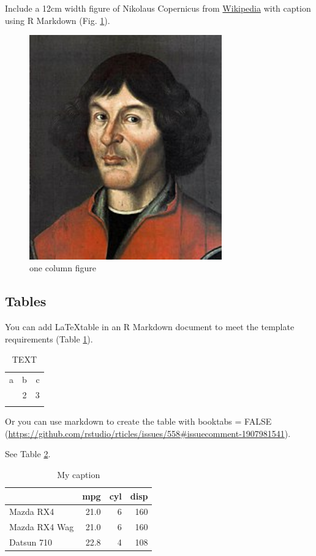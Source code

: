 \documentclass[soil, manuscript]{copernicus}
\begin{document}
Include a 12cm width figure of Nikolaus Copernicus from \href{https://en.wikipedia.org/wiki/File:Nikolaus_Kopernikus.jpg}{Wikipedia} with caption using R Markdown (Fig. \ref{fig:portrait}).

\begin{figure}
\includegraphics[width=8.3cm]{Nikolaus_Kopernikus} \caption{one column figure}\label{fig:portrait}
\end{figure}

\subsection{Tables}

You can add \LaTeX table in an R Markdown document to meet the template requirements (Table \ref{tab:latextable}).

\begin{table}[t]
\caption{TEXT}
\begin{tabular}{l c r}
\tophline

a & b & c \\
\middlehline
1 & 2 & 3 \\

\bottomhline
\end{tabular}
\label{tab:latextable}
\end{table}

Or you can use markdown to create the table with booktabs = FALSE (\url{https://github.com/rstudio/rticles/issues/558\#issuecomment-1907981541}).

See Table \ref{tab:test}.

\begin{table}

\caption{\label{tab:test}My caption}
\centering
\begin{tabular}[t]{l|r|r|r}
\hline
  & mpg & cyl & disp\\
\hline
Mazda RX4 & 21.0 & 6 & 160\\
\hline
Mazda RX4 Wag & 21.0 & 6 & 160\\
\hline
Datsun 710 & 22.8 & 4 & 108\\
\hline
\end{tabular}
\end{table}
\end{document}
